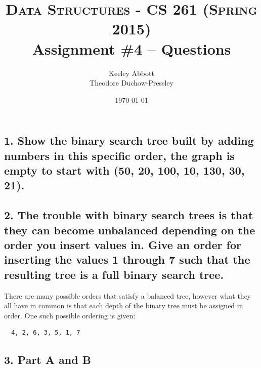 \documentclass[letter,11pt]{scrartcl}
\title{
  \normalfont \normalsize
  \textsc{Data Structures - CS 261 (Spring 2015)} \\
  \huge Assignment \#4 -- Questions
}
\author{Keeley Abbott
\\ Theodore Duchow-Pressley}
\date{\normalsize\today}
\begin{document}
\maketitle


\subsection*{1. Show the binary search tree built by adding numbers in this
  specific order, the graph is empty to start with (50, 20, 100, 10, 130, 30,
  21).}



\subsection*{2. The trouble with binary search trees is that they can become
  unbalanced depending on the order you insert values in. Give an order for
  inserting the values 1 through 7 such that the resulting tree is a full
  binary search tree.}

There are many possible orders that satisfy a balanced tree, however what they
all have in common is that each depth of the binary tree must be assigned in
order. One such possible ordering is given:

\begin{verbatim}
  4, 2, 6, 3, 5, 1, 7
\end{verbatim}


\subsection*{3. Part A and B}
\end{document}
